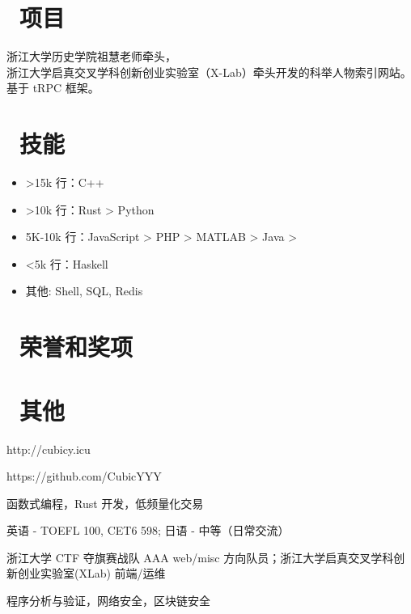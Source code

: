 \documentclass{resume}
\begin{document}
\section{\faFileCodeO\ 项目}
浙江大学历史学院祖慧老师牵头， \\ 
浙江大学启真交叉学科创新创业实验室（X-Lab）牵头开发的科举人物索引网站。\\
基于 tRPC 框架。

\section{\faCogs\ 技能}
\begin{itemize}[parsep=0.5ex]
  \item >15k 行：C++
  \item >10k 行：Rust > Python
  \item 5K-10k 行：JavaScript > PHP > MATLAB > Java > 
  \item <5k 行：Haskell
  \item 其他: Shell, SQL, Redis
\end{itemize}

\section{\faHeartO\ 荣誉和奖项}


\section{\faInfo\ 其他}
\begin{description}[parsep=0.5ex]
  \item[个人博客] http://cubicy.icu
  \item[GitHub] https://github.com/CubicYYY
  \item[技术兴趣] 函数式编程，Rust 开发，低频量化交易
  \item[语言能力] 英语 - TOEFL 100, CET6 598; 日语 - 中等（日常交流）
  \item[团队参与] 浙江大学 CTF 夺旗赛战队 AAA web/misc 方向队员；浙江大学启真交叉学科创新创业实验室(XLab) 前端/运维
  \item[研究兴趣] 程序分析与验证，网络安全，区块链安全
\end{description}

%
%
\end{document}
